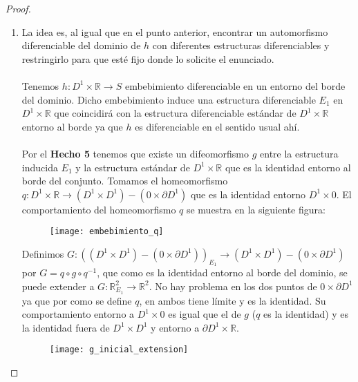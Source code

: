 \begin{proof}
\begin{enumerate}
		\item La idea es, al igual que en el punto anterior, encontrar un automorfismo diferenciable del dominio de $h$ con diferentes estructuras diferenciables y restringirlo para que esté fijo donde lo solicite el enunciado.\\
			\\ Tenemos $h: D^1\times \mathbb{R} \rightarrow S$ embebimiento diferenciable en un entorno del borde del dominio. Dicho embebimiento induce una estructura diferenciable $E_1$ en $D^1\times \mathbb{R}$ que coincidirá con la estructura diferenciable estándar de $D^1\times \mathbb{R}$ entorno al borde ya que $h$ es diferenciable en el sentido usual ahí.\\
			\\ Por el \textbf{Hecho 5} tenemos que existe un difeomorfismo $g$ entre la estructura inducida $E_1$ y la estructura estándar de $D^1\times \mathbb{R}$ que es la identidad entorno al borde del conjunto. Tomamos el homeomorfismo $q: D^1\times \mathbb{R} \rightarrow (D^1\times D^1) - (0 \times \partial D^1)$ que es la identidad entorno $D^1\times 0$. El comportamiento del homeomorfismo $q$ se muestra en la siguiente figura:\\
			
			\begin{figure}[h]
  				\centering
  				\texttt{[image: embebimiento\_q]}
  				\label{fig:embebimiento_q}
			\end{figure}
			
			Definimos $G:  ((D^1\times D^1) - (0 \times \partial D^1))_{E_1} \rightarrow (D^1\times D^1) - (0 \times \partial D^1)$ por $G = q \circ g \circ q^{-1}$, que como es la identidad entorno al borde del dominio, se puede extender a $G:\mathbb{R}^2_{E_1} \rightarrow \mathbb{R}^2$. No hay problema en los dos puntos de $0 \times \partial D^1$ ya que por como se define $q$, en ambos tiene límite y es la identidad. Su comportamiento entorno a $D^1 \times 0$ es igual que el de $g$ ($q$ es la identidad) y es la identidad fuera de $D^1 \times D^1$ y entorno a $\partial D^1 \times \mathbb{R}$.\\
			
			\begin{figure}[h]
  				\centering
  				\texttt{[image: g\_inicial\_extension]}
  				\label{fig:g_inicial_extension}
			\end{figure}
			

\end{enumerate}
\end{proof}
